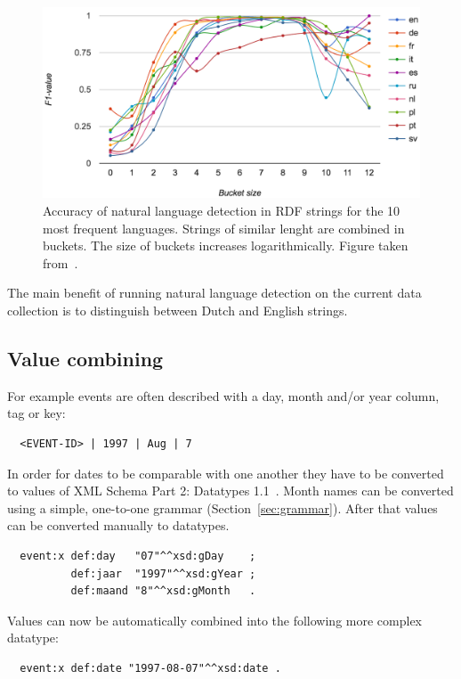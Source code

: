 \documentclass[a4paper]{scrartcl}
\begin{document}
\begin{figure}
  \includegraphics[width=\linewidth]{img/natlang.png}
  \caption{Accuracy of natural language detection in RDF strings for
    the 10 most frequent languages.  Strings of similar lenght are
    combined in buckets.  The size of buckets increases
    logarithmically.  Figure taken from~\cite{Beek2016}.}
  \label{fig:natlang}
\end{figure}

The main benefit of running natural language detection on the current
data collection is to distinguish between Dutch and English strings.


\subsection{Value combining}

For example events are often described with a day, month and/or year
column, tag or key:

\begin{lstlisting}
  <EVENT-ID> | 1997 | Aug | 7
\end{lstlisting}

In order for dates to be comparable with one another they have to be
converted to values of XML Schema Part 2: Datatypes 1.1~\cite{xsd11}.
Month names can be converted using a simple, one-to-one grammar
(Section~\ref{sec:grammar}).  After that values can be converted
manually to datatypes.

\begin{verbatim}
  event:x def:day   "07"^^xsd:gDay    ;
          def:jaar  "1997"^^xsd:gYear ;
          def:maand "8"^^xsd:gMonth   .
\end{verbatim}

Values can now be automatically combined into the following more
complex datatype:

\begin{verbatim}
  event:x def:date "1997-08-07"^^xsd:date .
\end{verbatim}
\end{document}
